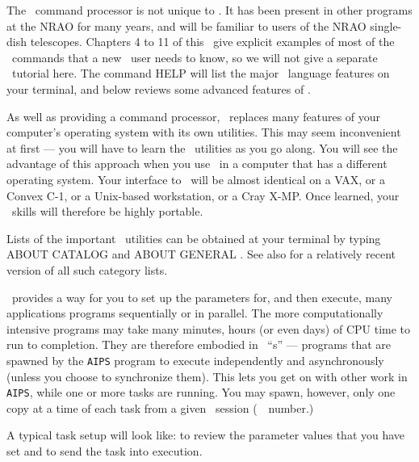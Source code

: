      The \POPS\ command processor is not unique to \hbox{\AIPS}.  It
has been present in other programs at the NRAO for many years, and
will be familiar to users of the NRAO single-dish telescopes.
Chapters 4 to 11 of this \Cookbook\ give explicit examples of most of
the \POPS\ commands that a new \AIPS\ user needs to know, so we will
not give a separate \POPS\ tutorial here. The command {\us HELP
 \CR} will list the major \POPS\ language features on
your terminal, and  below reviews some advanced features
of \hbox{\POPS}.

     As well as providing a command processor, \AIPS\ replaces many
features of your computer's operating system with its own utilities.
This may seem inconvenient at first --- you will have to learn the
\AIPS\ utilities as you go along. You will see the advantage of this
approach when you use \AIPS\ in a computer that has a different
operating system.  Your interface to \AIPS\ will be almost identical
on a VAX, or a Convex C-1, or a Unix-based workstation, or a Cray
\hbox{X-MP}.  Once learned, your \AIPS\ skills will therefore be
highly portable.

     Lists of the important \AIPS\ utilities can be obtained at your
terminal by typing {\us ABOUT CATALOG \CR} and {\us ABOUT GENERAL
\hbox{\CR}}.  See also  for a relatively recent version of
all such category lists.


     \AIPS\ provides a way for you to set up the parameters for, and
then execute, many applications programs sequentially or in parallel.
The more computationally intensive programs may take many minutes, hours
(or even days) of CPU time to run to completion.  They are therefore
embodied in \AIPS\ ``s'' --- programs that are spawned by
the {\tt AIPS} program to execute independently and asynchronously
(unless you choose to synchronize them).  This lets you get on with
other work in {\tt AIPS}, while one or more tasks are running.  You
may spawn, however, only one copy at a time of each task from a given
\AIPS\ session (\ie\ \POPS\ number.)

      A typical task setup will look like:
\btd
{}
\etd
{}
\btd
{} {to review the parameter values that you have set and}
 {to send the task into execution.}
\etd
{}

